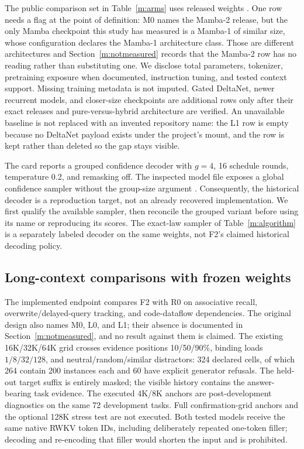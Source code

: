 The public comparison set in Table~\ref{m:arms} uses released weights \citep{rwkvrelease,mambarelease,glarelease,deltarelease,lladarelease}. One row needs a flag at the point of definition: M0 names the Mamba-2 release, but the only Mamba checkpoint this study has measured is a Mamba-1 of similar size, whose configuration declares the Mamba-1 architecture class. Those are different architectures and Section~\ref{m:notmeasured} records that the Mamba-2 row has no reading rather than substituting one. We disclose total parameters, tokenizer, pretraining exposure when documented, instruction tuning, and tested context support. Missing training metadata is not imputed. Gated DeltaNet, newer recurrent models, and closer-size checkpoints are additional rows only after their exact releases and pure-versus-hybrid architecture are verified. An unavailable baseline is not replaced with an invented repository name: the L1 row is empty because no DeltaNet payload exists under the project's mount, and the row is kept rather than deleted so the gap stays visible.

The card reports a grouped confidence decoder with $g=4$, 16 schedule rounds, temperature 0.2, and remasking off. The inspected model file exposes a global confidence sampler without the group-size argument \citep{f2source}. Consequently, the historical decoder is a reproduction target, not an already recovered implementation. We first qualify the available sampler, then reconcile the grouped variant before using its name or reproducing its scores. The exact-law sampler of Table~\ref{m:algorithm} is a separately labeled decoder on the same weights, not F2's claimed historical decoding policy.

\subsection{Long-context comparisons with frozen weights}
\label{m:long}
The implemented endpoint compares F2 with R0 on associative recall, overwrite/delayed-query tracking, and code-dataflow dependencies. The original design also names M0, L0, and L1; their absence is documented in Section~\ref{m:notmeasured}, and no result against them is claimed. The existing 16K/32K/64K grid crosses evidence positions 10/50/90\%, binding loads $1/8/32/128$, and neutral/random/similar distractors: 324 declared cells, of which 264 contain 200 instances each and 60 have explicit generator refusals. The held-out target suffix is entirely masked; the visible history contains the answer-bearing task evidence. The executed 4K/8K anchors are post-development diagnostics on the same 72 development tasks. Full confirmation-grid anchors and the optional 128K stress test are not executed. Both tested models receive the same native RWKV token IDs, including deliberately repeated one-token filler; decoding and re-encoding that filler would shorten the input and is prohibited.

